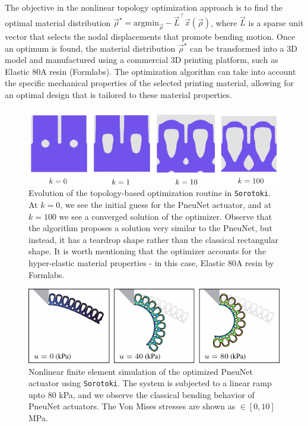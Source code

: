 The objective in the nonlinear topology optimization approach is to find the optimal material distribution $\vec{\rho}^\star = \textrm{argmin}_{\vec{\rho}}  -\vec{L}^\top \vec{x}(\vec{\rho})$, where $\vec{L}$ is a sparse unit vector that selects the nodal displacements that promote bending motion. Once an optimum is found, the material distribution $\vec{\rho}^\star$ can be transformed into a 3D model and manufactured using a commercial 3D printing platform, such as Elastic 80A resin (Formlabs). The optimization algorithm can take into account the specific mechanical properties of the selected printing material, allowing for an optimal design that is tailored to these material properties.
%
\begin{figure}[!t]
    \vspace{-2mm}
    \centering
    \includegraphics*[width=.95\textwidth]{./pdf/thesis-figure-6-22.pdf}
    \caption{\small Evolution of the topology-based optimization routine in \texttt{Sorotoki}. At $k=0$, we see the initial guess for the PneuNet actuator, and at $k=100$ we see a converged solution of the optimizer. Observe that the algorithm proposes a solution very similar to the PneuNet, but instead, it has a teardrop shape rather than the classical rectangular shape. It is worth mentioning that the optimizer accounts for the hyper-elastic material properties - in this case, Elastic 80A resin by Formlabs.}
    \label{fig:C5:fig_optpneunet_solutions}
\end{figure}

\begin{figure}[!t]
    \centering
    \includegraphics*[width=.95\textwidth]{./pdf/thesis-figure-6-23.pdf}
    \caption{\small Nonlinear finite element simulation of the optimized PneuNet actuator using \texttt{Sorotoki}. The system is subjected to a linear ramp upto 80 \si{\kilo \pascal}, and we observe the classical bending behavior of PneuNet actuators. The Von Mises stresses are shown as \protect{}$\!\!\in [0,10]$ \si{\mega \pascal}. }
    \label{fig:C5:fig_optpneunet_fem}
    \vspace{-3mm}
\end{figure}
%

